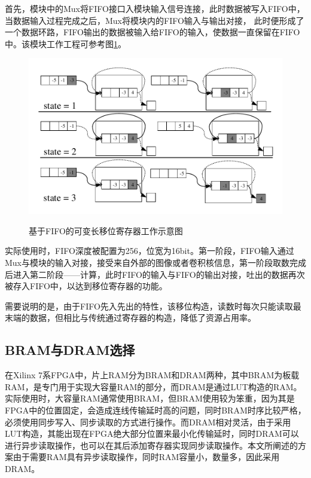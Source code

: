 首先，模块中的Mux将FIFO接口入模块输入信号连接，此时数据被写入FIFO中，当数据输入过程完成之后，Mux将模块内的FIFO输入与输出对接，
此时便形成了一个数据环路，FIFO输出的数据被输入给FIFO的输入，使数据一直保留在FIFO中。该模块工作工程可参考图\ref{shift_k}。
\begin{figure}[h]
    \centering
    \includegraphics[scale=0.8]{../pdf/shift_k.pdf}\\
    \caption{基于FIFO的可变长移位寄存器工作示意图}
    \label{shift_k}
\end{figure}
实际使用时，FIFO深度被配置为256，位宽为16bit。第一阶段，FIFO输入通过Mux与模块的输入对接，接受来自外部的图像或者卷积核信息，第一阶段取数完成后进入第二阶段——计算，此时FIFO的输入与FIFO的输出对接，吐出的数据再次被存入FIFO中，以达到移位寄存器的功能。

需要说明的是，由于FIFO先入先出的特性，该移位构造，读数时每次只能读取最末端的数据，但相比与传统通过寄存器的构造，降低了资源占用率。

    \subsection{BRAM与DRAM选择}
    在Xilinx 7系FPGA中，片上RAM分为BRAM和DRAM两种，其中BRAM为板载RAM，是专门用于实现大容量RAM的部分，而DRAM是通过LUT构造的RAM。实际使用时，大容量RAM通常使用BRAM，但BRAM使用较为笨重，因为其是FPGA中的位置固定，会造成连线传输延时高的问题，同时BRAM时序比较严格，必须使用同步写入、同步读取的方式进行操作。而DRAM相对灵活，由于采用LUT构造，其能出现在FPGA绝大部分位置来最小化传输延时，同时DRAM可以进行异步读取操作，也可以在其后添加寄存器实现同步读取操作。本文所阐述的方案由于需要RAM具有异步读取操作，同时RAM容量小，数量多，因此采用DRAM。

